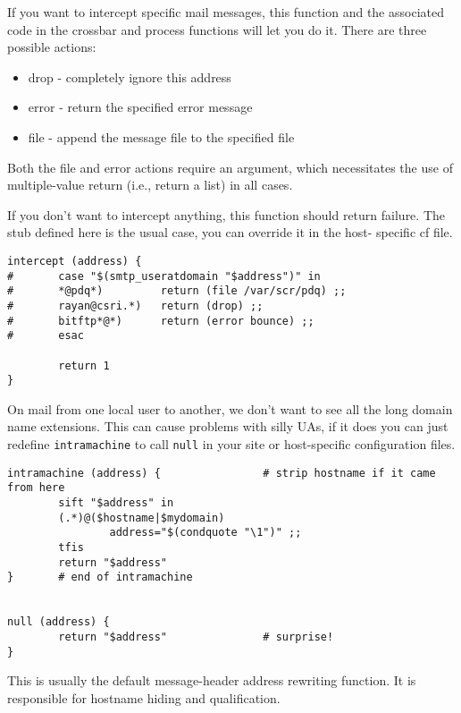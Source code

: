 If you want to intercept specific mail messages, this function and the
associated code in the crossbar and process functions will let you do it.  
There are three possible actions:

\begin{itemize}
\item drop      - completely ignore this address
\item error     - return the specified error message
\item file      - append the message file to the specified file
\end{itemize}


Both the file and error actions require an argument, which necessitates
the use of multiple-value return (i.e., return a list) in all cases.

If you don't want to intercept anything, this function should return failure.
The stub defined here is the usual case, you can override it in the host-
specific cf file.

\begin{tscreen}
\begin{verbatim}
intercept (address) {
#       case "$(smtp_useratdomain "$address")" in
#       *@pdq*)         return (file /var/scr/pdq) ;;
#       rayan@csri.*)   return (drop) ;;
#       bitftp*@*)      return (error bounce) ;;
#       esac

        return 1
}
\end{verbatim}
\end{tscreen}


On mail from one local user to another, we don't want to see all the
long domain name extensions.  This can cause problems with silly UAs,
if it does you can just redefine {\tt intramachine} to call 
{\tt null} in your
site or host-specific configuration files.

\begin{tscreen}
\begin{verbatim}
intramachine (address) {                # strip hostname if it came from here
        sift "$address" in
        (.*)@($hostname|$mydomain)
                address="$(condquote "\1")" ;;
        tfis
        return "$address"
}       # end of intramachine


null (address) {
        return "$address"               # surprise!
}
\end{verbatim}
\end{tscreen}


This is usually the default message-header address rewriting function.
It is responsible for hostname hiding and qualification.

